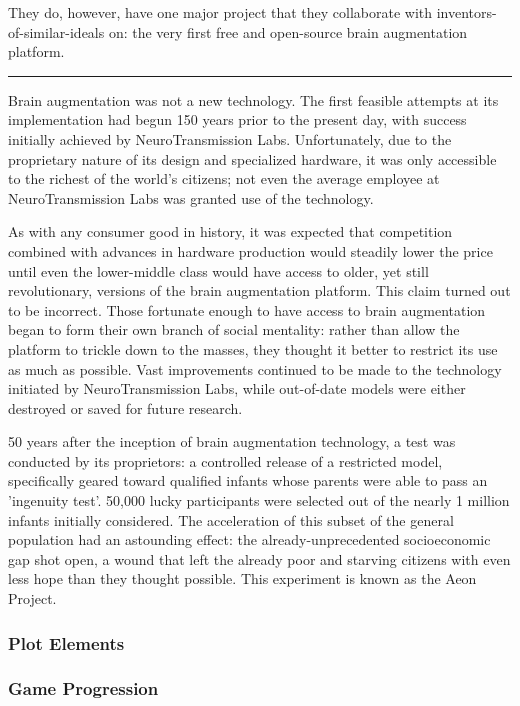 \documentclass[12pt,titlepage]{article}
\newcommand\sep{\rule{2.5in}{0.1mm}}
\begin{document}
They do, however, have one major project that they collaborate with
inventors-of-similar-ideals on: the very first free and open-source brain
augmentation platform.

\sep

Brain augmentation was not a new technology. The first feasible attempts at its
implementation had begun 150 years prior to the present day, with success
initially achieved by NeuroTransmission Labs. Unfortunately, due to the
proprietary nature of its design and specialized hardware, it was only
accessible to the richest of the world's citizens; not even the average employee
at NeuroTransmission Labs was granted use of the technology.

As with any consumer good in history, it was expected that competition combined
with advances in hardware production would steadily lower the price until even
the lower-middle class would have access to older, yet still revolutionary,
versions of the brain augmentation platform. This claim turned out to be
incorrect. Those fortunate enough to have access to brain augmentation began to
form their own branch of social mentality: rather than allow the platform to
trickle down to the masses, they thought it better to restrict its use as much
as possible. Vast improvements continued to be made to the technology initiated
by NeuroTransmission Labs, while out-of-date models were either destroyed or
saved for future research.

50 years after the inception of brain augmentation technology, a test was
conducted by its proprietors: a controlled release of a restricted model,
specifically geared toward qualified infants whose parents were able to pass an
'ingenuity test'. 50,000 lucky participants were selected out of the nearly 1
million infants initially considered. The acceleration of this subset of the
general population had an astounding effect: the already-unprecedented
socioeconomic gap shot open, a wound that left the already poor and starving
citizens with even less hope than they thought possible. This experiment is 
known as the Aeon Project.

\subsubsection{Plot Elements}


\subsubsection{Game Progression}
\end{document}
